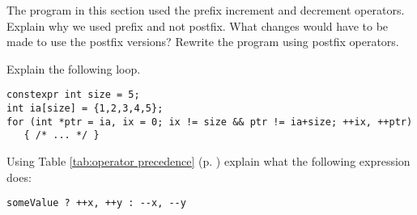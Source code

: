 %
%
\begin{question}
The program in this section used the prefix increment and
decrement operators. Explain why we used prefix and not postfix. What
changes would have to be made to use the postfix versions? Rewrite the
program using postfix operators.
\end{question}

\begin{question}
Explain the following loop.
\begin{lstlisting}
constexpr int size = 5;
int ia[size] = {1,2,3,4,5};
for (int *ptr = ia, ix = 0; ix != size && ptr != ia+size; ++ix, ++ptr)
   { /* ... */ }
\end{lstlisting}
\end{question}

\begin{question}
Using Table \ref{tab:operator precedence} (p. \pageref{tab:operator precedence}) explain what the following expression does:
\begin{lstlisting}
someValue ? ++x, ++y : --x, --y
\end{lstlisting}
\end{question}
